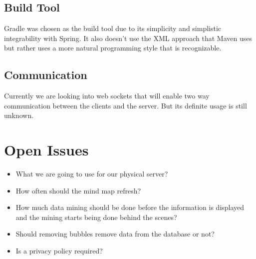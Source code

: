 \documentclass[hidelinks,english]{article}
\begin{document}
		\subsection{Build Tool}
			Gradle was chosen as the build tool due to its simplicity and simplistic integrability with Spring. It also doesn't use the XML approach that Maven uses but rather uses a more natural programming style that is recognizable.
			
		\subsection{Communication}
			Currently we are looking into web sockets that will enable two way communication between the clients and the server. But its definite usage is still unknown.
	
	\section{Open Issues}
		\begin{itemize}
			\item What we are going to use for our physical server?
			\item How often should the mind map refresh?
			\item How much data mining should be done before the information is displayed and the mining starts being done behind the scenes?
			\item Should removing bubbles remove data from the database or not?
			\item Is a privacy policy required?
		\end{itemize}
\end{document}
